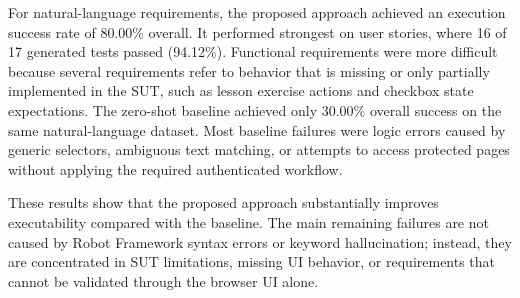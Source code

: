 For natural-language requirements, the proposed approach achieved an execution
success rate of 80.00\% overall. It performed strongest on user stories, where
16 of 17 generated tests passed (94.12\%). Functional requirements were more
difficult because several requirements refer to behavior that is missing or only
partially implemented in the SUT, such as lesson exercise actions and checkbox
state expectations. The zero-shot baseline achieved only 30.00\% overall
success on the same natural-language dataset. Most baseline failures were logic
errors caused by generic selectors, ambiguous text matching, or attempts to
access protected pages without applying the required authenticated workflow.

These results show that the proposed approach substantially improves
executability compared with the baseline. The main remaining failures are not
caused by Robot Framework syntax errors or keyword hallucination; instead, they
are concentrated in SUT limitations, missing UI behavior, or requirements that
cannot be validated through the browser UI alone.
